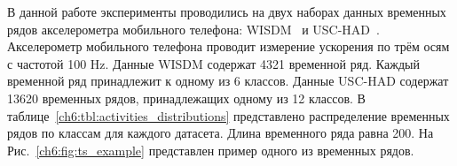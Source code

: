 В данной работе эксперименты проводились на двух наборах данных временных рядов акселерометра мобильного телефона: WISDM~\cite{wisdm} и USC-HAD~\cite{usc}. 
Акселерометр мобильного телефона проводит измерение ускорения по трём осям с частотой 100 Hz.
Данные WISDM содержат 4321 временной ряд.
Каждый временной ряд принадлежит к одному из 6 классов. 
Данные USC-HAD содержат 13620 временных рядов, принадлежащих одному из 12 классов.  
В таблице~\ref{ch6:tbl:activities_distributions} представлено распределение временных рядов по классам для каждого датасета.
Длина временного ряда равна 200.
На Рис.~\ref{ch6:fig:ts_example} представлен пример одного из временных рядов.

\begin{table}[!ht]
	\centering
	\caption{Распределение объектов по классам для временных рядов акселерометра}
	\hspace{0.5cm}
	\label{ch6:tbl:activities_distributions}
\end{table}

